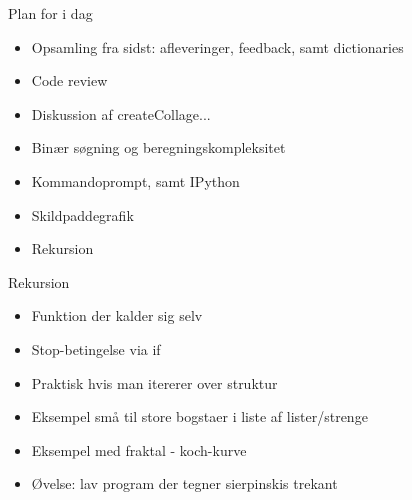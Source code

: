 \documentclass[a4paper,landscape]{slides}
\begin{document}
\begin{slide}
	\begin{center} {\large 
            Plan for i dag
	} \end{center}
	\begin{itemize} \addtolength{\itemsep}{-\baselineskip}
		\item Opsamling fra sidst: afleveringer, feedback, samt dictionaries
                \item Code review
		\item Diskussion af createCollage...
                \item Binær søgning og beregningskompleksitet
		\item Kommandoprompt, samt IPython
		\item Skildpaddegrafik 
                \item Rekursion
	\end{itemize}
\end{slide}

\begin{slide}
	\begin{center} {\large 
            Rekursion
	} \end{center}
	\begin{itemize} \addtolength{\itemsep}{-\baselineskip}
                \item Funktion der kalder sig selv
                \item Stop-betingelse via if
                \item Praktisk hvis man itererer over struktur
		\item Eksempel små til store bogstaer i liste af lister/strenge
		\item Eksempel med fraktal - koch-kurve
		\item Øvelse: lav program der tegner sierpinskis trekant
	\end{itemize}
\end{slide}
\end{document}
